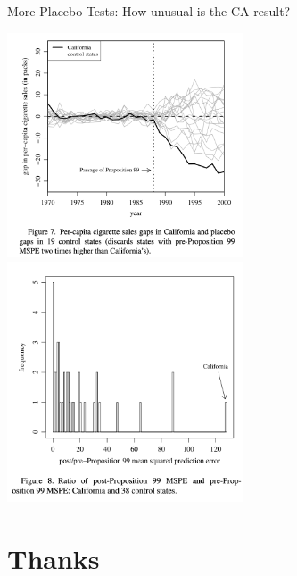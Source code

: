 \documentclass[xcolor=pdftex,dvipsnames,table,mathserif,aspectratio=169]{beamer}
\begin{document}
\begin{frame}{More Placebo Tests: How unusual is the CA result?}
\begin{center}
\includegraphics[width=2.75in]{./resources/abadie_6.png}
\includegraphics[width=2.75in]{./resources/abadie_7.png}
\end{center}
\end{frame}
\section{Thanks}
\end{document}
